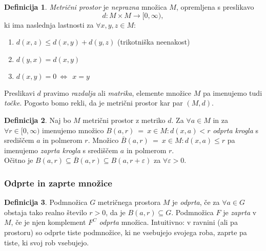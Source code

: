 \documentclass[11pt]{article}
\theoremstyle{definition}
\newtheorem{definicija}{Definicija}[section]
\theoremstyle{definition}
\theoremstyle{definition}
\begin{document}
\begin{definicija}

\textit{Metrični prostor} je \textit{neprazna} množica $M$, opremljena s preslikavo
$$d: M \times M \rightarrow [0, \infty),$$
ki ima naslednja lastnosti za $\forall x, y, z \in M$:
\begin{enumerate}
	\item $d(x, z) \leq d(x, y) + d(y, z)$ (trikotniška neenakost)
	\item $d(y, x) = d(x, y)$
	\item $d(x, y) = 0 ~\iff~~ x = y$
\end{enumerate}
Preslikavi $d$ pravimo \textit{razdalja} ali \textit{matrika}, elemente množice $M$ pa imenujemo tudi \textit{točke}. Pogosto bomo rekli, da je metrični prostor kar par $(M, d)$.

\end{definicija}
\vspace{0.5cm}

\begin{definicija}

Naj bo $M$ metrični prostor z metriko $d$. Za $\forall a \in M$ in za $\forall r \in [0, \infty)$ imenujemo množico 
$B(a, r) ~=~ {x \in M: d(x, a) < r}$
\textit{odprta krogla} s središčem $a$ in polmerom $r$. Množico 
$\overline{B}(a, r) ~=~ {x \in M: d(x, a) \leq r}$
pa imenujemo \textit{zaprta krogla} s središčem $a$ in polmerom $r$. \\

\noindent Očitno je $B(a, r) \subseteq \overline{B}(a, r) \subseteq B(a, r + \varepsilon)$ za $\forall \varepsilon > 0$.

\end{definicija}
\vspace{0.5cm}


\subsubsection{Odprte in zaprte množice}
\vspace{0.5cm}

\begin{definicija}

Podmnožica $G$ metričnega prostora $M$ je \textit{odprta}, če za $\forall a \in G$ obstaja tako realno število $r > 0$, da je $B(a, r) \subseteq G$. Podmnožica $F$ je \textit{zaprta} v $M$, če je njen komplement $F^C$ \textit{odprta} množica. Intuitivno: v ravnini (ali pa prostoru) so odprte tiste podmnožice, ki ne vsebujejo svojega roba, zaprte pa tiste, ki svoj rob vsebujejo.

\end{definicija}
\vspace{0.5cm}
\end{document}
